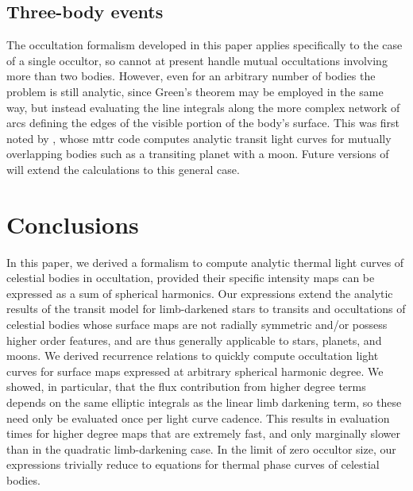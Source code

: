 \documentclass[modern]{aastex61}
\begin{document}
\subsection{Three-body events}
The occultation formalism developed in this paper applies specifically to the
case of a single occultor, so \starry cannot at present handle mutual occultations
involving more than two bodies. However, even for an arbitrary number of bodies
the problem is still analytic, since Green's theorem may be employed in the same
way, but instead evaluating the line integrals along the more complex network of
arcs defining the edges of the visible portion of the body's surface. This was
first noted by \cite{Pal2012}, whose \textsf{mttr} code computes analytic
transit light curves for mutually overlapping bodies such as a transiting
planet with a moon. Future versions of \starry will extend the calculations
to this general case.

\section{Conclusions}
\label{sec:conclusions}

In this paper, we derived a formalism to compute analytic thermal light curves of celestial
bodies in occultation, provided their specific intensity maps can be expressed as a sum
of spherical harmonics. Our expressions extend the analytic results of the
\citet{MandelAgol2002} transit model for limb-darkened stars to transits and
occultations of celestial bodies whose surface maps are not radially symmetric
and/or possess higher order features, and are thus generally applicable to
stars, planets, and moons. We derived recurrence relations to quickly compute
occultation light curves for surface maps expressed at arbitrary spherical harmonic degree.
We showed, in particular, that the flux contribution from higher degree terms
depends on the same elliptic integrals as the linear limb darkening term,
so these need only be evaluated once per light curve cadence. This results in
evaluation times for higher degree maps that are extremely fast, and
only marginally slower than in the quadratic limb-darkening case.
In the limit of zero occultor size, our expressions trivially reduce to equations
for thermal phase curves of celestial bodies.
\end{document}
